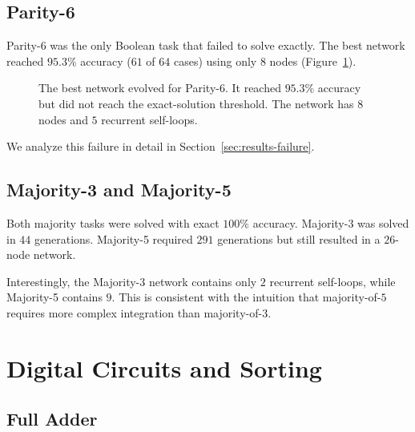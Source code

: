 \subsection{Parity-6}
\label{sec:results-parity6}

Parity-6 was the only Boolean task that \modnet{} failed to solve
exactly. The best network reached $95.3\%$ accuracy ($61$ of $64$
cases) using only $8$ nodes (Figure~\ref{fig:parity6-spring}).

\begin{figure}[h]
  \centering
  \caption{The best network evolved for Parity-6. It reached $95.3\%$
    accuracy but did not reach the exact-solution threshold. The
    network has $8$ nodes and $5$ recurrent self-loops.}
  \label{fig:parity6-spring}
\end{figure}

We analyze this failure in detail in Section~\ref{sec:results-failure}.

\subsection{Majority-3 and Majority-5}
\label{sec:results-majority}

Both majority tasks were solved with exact $100\%$ accuracy.
Majority-3 was solved in $44$ generations. Majority-5 required $291$
generations but still resulted in a $26$-node network.

Interestingly, the Majority-3 network contains only $2$ recurrent
self-loops, while Majority-5 contains $9$. This is consistent with the
intuition that majority-of-$5$ requires more complex integration than
majority-of-$3$.

\section{Digital Circuits and Sorting}
\label{sec:results-circuits}

\subsection{Full Adder}
\label{sec:results-full-adder}

